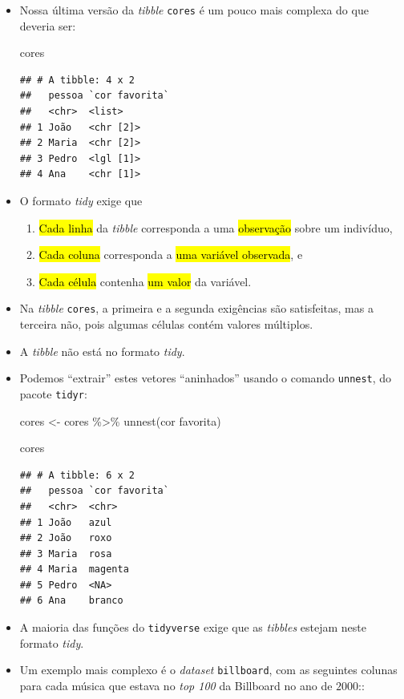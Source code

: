 \documentclass[
  11pt]{report}
\newenvironment{Shaded}{\begin{snugshade}}{\end{snugshade}}
\newcommand{\AttributeTok}[1]{\textcolor[rgb]{0.77,0.63,0.00}{#1}}
\newcommand{\FunctionTok}[1]{\textcolor[rgb]{0.00,0.00,0.00}{#1}}
\newcommand{\NormalTok}[1]{#1}
\newcommand{\OtherTok}[1]{\textcolor[rgb]{0.56,0.35,0.01}{#1}}
\newcommand{\SpecialCharTok}[1]{\textcolor[rgb]{0.00,0.00,0.00}{#1}}
\newcommand{\StringTok}[1]{\textcolor[rgb]{0.31,0.60,0.02}{#1}}
\renewenvironment{Shaded}{
    \begin{mdframed}[%
      roundcorner=2pt,%
      innerleftmargin=5pt,%
      innerrightmargin=5pt,%
      topline=true,%
      leftline=true,%
      rightline=true,%
      bottomline=true,%
      linewidth=0.5pt,%
      linecolor=black!20,%
      backgroundcolor=black!2,%
      skipabove=2ex,%
      skipbelow=2.5ex%
    ]%
  }
  {
    \end{mdframed}
  }
\begin{document}
\begin{itemize}
\item
  Nossa última versão da \emph{tibble} \texttt{cores} é um pouco mais complexa do que deveria ser:

\begin{Shaded}
\begin{Highlighting}[]
\NormalTok{cores}
\end{Highlighting}
\end{Shaded}

\begin{verbatim}
## # A tibble: 4 x 2
##   pessoa `cor favorita`
##   <chr>  <list>        
## 1 João   <chr [2]>     
## 2 Maria  <chr [2]>     
## 3 Pedro  <lgl [1]>     
## 4 Ana    <chr [1]>
\end{verbatim}
\item
  O formato \emph{tidy} exige que

  \begin{enumerate}
  \def\labelenumi{\arabic{enumi}.}
  \item
    {\hl{Cada linha}} da \emph{tibble} corresponda a uma {\hl{observação}} sobre um indivíduo,
  \item
    {\hl{Cada coluna}} corresponda a {\hl{uma variável observada}}, e
  \item
    {\hl{Cada célula}} contenha {\hl{um valor}} da variável.
  \end{enumerate}
\item
  Na \emph{tibble} \texttt{cores}, a primeira e a segunda exigências são satisfeitas, mas a terceira não, pois algumas células contém valores múltiplos.
\item
  A \emph{tibble} não está no formato \emph{tidy}.
\item
  Podemos ``extrair'' estes vetores ``aninhados'' usando o comando \texttt{unnest}, do pacote \texttt{tidyr}:

\begin{Shaded}
\begin{Highlighting}[]
\NormalTok{cores }\OtherTok{\textless{}{-}}\NormalTok{ cores }\SpecialCharTok{\%\textgreater{}\%} 
  \FunctionTok{unnest}\NormalTok{(}\StringTok{\textasciigrave{}}\AttributeTok{cor favorita}\StringTok{\textasciigrave{}}\NormalTok{)}

\NormalTok{cores}
\end{Highlighting}
\end{Shaded}

\begin{verbatim}
## # A tibble: 6 x 2
##   pessoa `cor favorita`
##   <chr>  <chr>         
## 1 João   azul          
## 2 João   roxo          
## 3 Maria  rosa          
## 4 Maria  magenta       
## 5 Pedro  <NA>          
## 6 Ana    branco
\end{verbatim}
\item
  A maioria das funções do \texttt{tidyverse} exige que as \emph{tibbles} estejam neste formato \emph{tidy}.
\item
  Um exemplo mais complexo é o \emph{dataset} \texttt{billboard}, com as seguintes colunas para cada música que estava no \emph{top 100} da Billboard no ano de $2000$::


\end{itemize}
\end{document}
